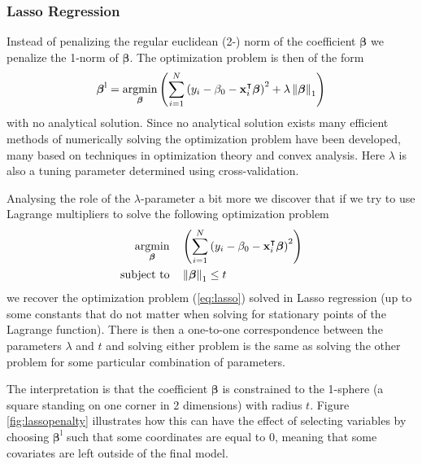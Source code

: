 \documentclass[a4paper, 12pt]{scrartcl}
\newcommand{\bfbeta}{\boldsymbol{\beta}}
\newcommand{\bfx}{\mathbf{x}}
\begin{document}

\subsubsection*{Lasso Regression}
\begin{algorithm}
Instead of penalizing the regular euclidean (2-) norm of the coefficient $\bfbeta$ we penalize the 1-norm of $\bfbeta$.
The optimization problem is then of the form
\begin{equation}\label{eq:lasso}
	\bfbeta^\mathrm{l}=\operatornamewithlimits{argmin}_{\bfbeta}\left(\sum_{i=1}^{N}\left(y_i-\beta_0-\bfx_i^\intercal\bfbeta\right)^2+\lambda\left\|\bfbeta\right\|_1\right)
\end{equation}
with no analytical solution.
Since no analytical solution exists many efficient methods of numerically solving the optimization problem have been developed, many based on techniques in optimization theory and convex analysis.
Here $\lambda$ is also a tuning parameter determined using cross-validation.
\end{algorithm}

Analysing the role of the $\lambda$-parameter a bit more we discover that if we try to use Lagrange multipliers to solve the following optimization problem
\begin{equation*}
	\begin{aligned}
	\operatornamewithlimits{argmin}_{\bfbeta} & & &\left(\sum_{i=1}^{N}\left(y_i-\beta_0-\bfx_i^\intercal\bfbeta\right)^2\right)\\
	\text{subject to} & & & \left\|\bfbeta\right\|_1 \leq t
	\end{aligned}
\end{equation*}
we recover the optimization problem (\ref{eq:lasso}) solved in Lasso regression (up to some constants that do not matter when solving for stationary points of the Lagrange function).
There is then a one-to-one correspondence between the parameters $\lambda$ and $t$ and solving either problem is the same as solving the other problem for some particular combination of parameters.

The interpretation is that the coefficient $\bfbeta$ is constrained to the 1-sphere (a square standing on one corner in 2 dimensions) with radius $t$.
Figure \ref{fig:lassopenalty} illustrates how this can have the effect of selecting variables by choosing $\bfbeta^\mathrm{l}$ such that some coordinates are equal to 0, meaning that some covariates are left outside of the final model.
\end{document}
